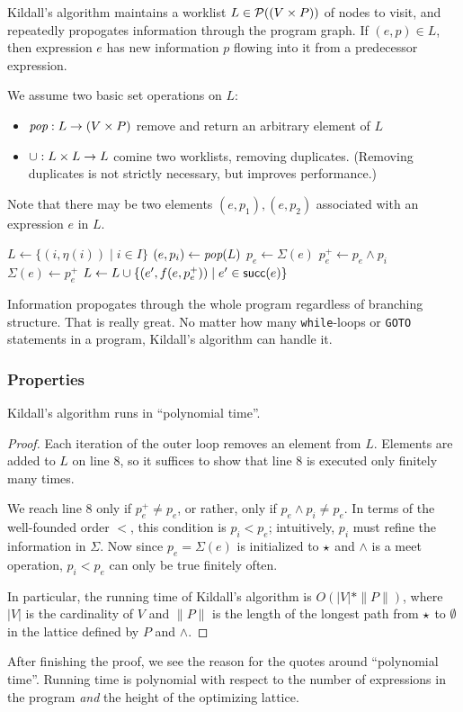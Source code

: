\documentclass{article}
\begin{document}
Kildall's algorithm maintains a worklist $L \in \mathcal{P}((V \times P))$ of nodes to visit, and repeatedly propogates information through the program graph.
If $(e, p) \in L$, then expression $e$ has new information $p$ flowing into it from a predecessor expression.

We assume two basic set operations on $L$:
\begin{itemize}
\item $\emph{pop} : L \rightarrow (V \times P)$ remove and return an arbitrary element of $L$
\item $\cup : L \times L \rightarrow L$ comine two worklists, removing duplicates.
  (Removing duplicates is not strictly necessary, but improves performance.)
\end{itemize}
Note that there may be two elements $(e, p_1), (e, p_2)$ associated with an expression $e$ in $L$.


\begin{algorithmic}[1]
\STATE $L \leftarrow \{(i, \eta(i)) \mid i \in I\}$
  \STATE $(e, p_i) \leftarrow \emph{pop}(L)$
  \STATE $p_e \leftarrow \Sigma(e)$
  \STATE $p_{e}^+ \leftarrow p_e \wedge p_i$
    \STATE $\Sigma(e) \leftarrow p_e^+$
    \STATE $L \leftarrow L \cup \{(e', f(e, p_{e}^+)) \mid e' \in \mathsf{succ}(e) \}$
  \ENDIF
\ENDWHILE
\end{algorithmic}

Information propogates through the whole program regardless of branching structure.
That is really great.
No matter how many {\tt while}-loops or {\tt GOTO} statements in a program, Kildall's algorithm can handle it.


\subsubsection*{Properties}
\label{properties}

\begin{t1}
Kildall's algorithm runs in ``polynomial time''.
\end{t1}
\begin{proof}
Each iteration of the outer loop removes an element from $L$.
Elements are added to $L$ on line 8, so it suffices to show that line 8 is executed only finitely many times.

We reach line 8 only if $p_{e}^+ \neq p_e$, or rather, only if $p_e \wedge p_i \neq p_e$.
In terms of the well-founded order $<$, this condition is $p_i < p_e$; intuitively, $p_i$ must refine the information in $\Sigma$.
Now since $p_e = \Sigma(e)$ is initialized to $\star$ and $\wedge$ is a meet operation, $p_i < p_e$ can only be true finitely often.

In particular, the running time of Kildall's algorithm is $O(|V| * \|P\|)$, where $|V|$ is the cardinality of $V$ and $\|P\|$ is the length of the longest path from $\star$ to $\emptyset$ in the lattice defined by $P$ and $\wedge$.
\end{proof}
After finishing the proof, we see the reason for the quotes around ``polynomial time''.
Running time is polynomial with respect to the number of expressions in the program \emph{and}
 the height of the optimizing lattice.
\end{document}
